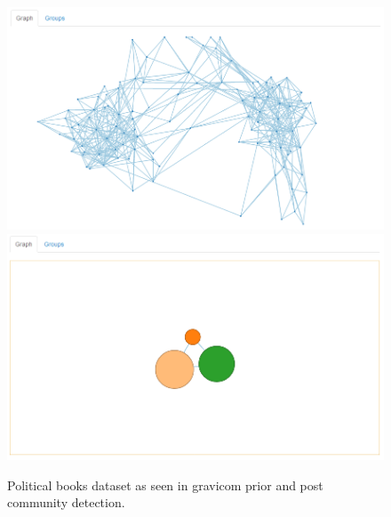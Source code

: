 \documentclass{article}\usepackage[]{graphicx}\usepackage[]{color}
\begin{document}
\begin{figure}[H]
\centering
\includegraphics[width=\textwidth]{images/polbooks_1.png}
\includegraphics[width=\textwidth]{images/polbooks_2.png}
\caption{\label{fig:polbooks_1} Political books dataset as seen in gravicom prior and post community detection.}
\end{figure}
\end{document}
